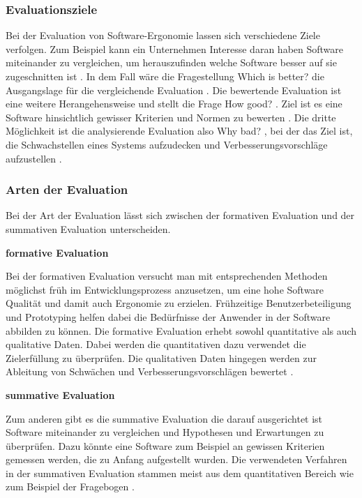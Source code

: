 \subsubsection{Evaluationsziele}

Bei der Evaluation von Software-Ergonomie lassen sich verschiedene Ziele verfolgen. Zum Beispiel kann ein Unternehmen Interesse daran haben Software miteinander zu vergleichen, um herauszufinden welche Software besser auf sie zugeschnitten ist \citep[vgl.][]{Gediga2002evaluation}. In dem Fall wäre die Fragestellung \glqq Which is better?\grqq{} die Ausgangslage für die vergleichende Evaluation \citep[vgl.][9]{Hegner2003}. Die bewertende Evaluation ist eine weitere Herangehensweise und stellt die Frage \glqq How good?\grqq{} \citep[vgl.][9]{Hegner2003}. Ziel ist es eine Software hinsichtlich gewisser Kriterien und Normen zu bewerten \citep[vgl.][]{Gediga2002evaluation}. Die dritte Möglichkeit ist die analysierende Evaluation also \glqq Why bad?\grqq{} \citep[vgl.][9]{Hegner2003}, bei der das Ziel ist, die Schwachstellen eines Systems aufzudecken und Verbesserungsvorschläge aufzustellen \citep[vgl.][]{Gediga2002evaluation}.


\subsubsection{Arten der Evaluation}
Bei der Art der Evaluation lässt sich zwischen der formativen Evaluation und der summativen Evaluation unterscheiden.

\textbf{formative Evaluation}

Bei der formativen Evaluation versucht man mit entsprechenden Methoden möglichst früh im Entwicklungsprozess anzusetzen, um eine hohe Software Qualität und damit auch Ergonomie zu erzielen. Frühzeitige Benutzerbeteiligung und Prototyping helfen dabei die Bedürfnisse der Anwender in der Software abbilden zu können. Die formative Evaluation erhebt sowohl quantitative als auch qualitative Daten. Dabei werden die quantitativen dazu verwendet die Zielerfüllung zu überprüfen. Die qualitativen Daten hingegen werden zur Ableitung von Schwächen und Verbesserungsvorschlägen bewertet \citep[vgl.][7]{Hegner2003}.

\textbf{summative Evaluation}

Zum anderen gibt es die summative Evaluation die darauf ausgerichtet ist Software miteinander zu vergleichen und Hypothesen und Erwartungen zu überprüfen. Dazu könnte eine Software zum Beispiel an gewissen Kriterien gemessen werden, die zu Anfang aufgestellt wurden. Die verwendeten Verfahren in der summativen Evaluation stammen meist aus dem quantitativen Bereich wie zum Beispiel der Fragebogen \citep[vgl.][8]{Hegner2003}.

